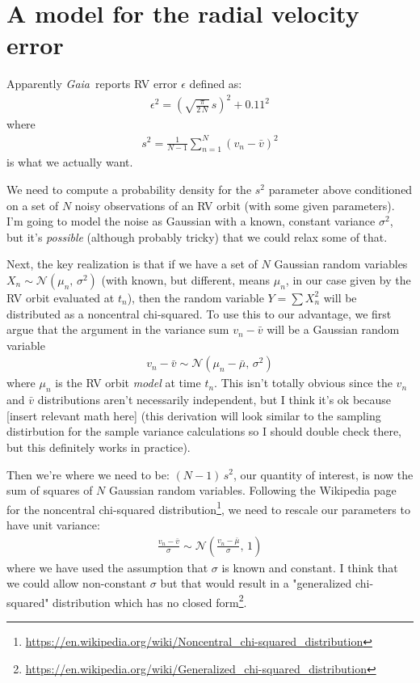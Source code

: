 \documentclass[modern, letterpaper]{aastex63}
\newcommand{\project}[1]{\textsl{#1}}
\newcommand{\Gaia}{\project{Gaia}}
\begin{document}
\section{A model for the radial velocity error}

Apparently \Gaia\ reports RV error $\epsilon$ defined as:
\begin{eqnarray}
	\epsilon^2 = \left(\sqrt{\frac{\pi}{2\,N}}\,s\right)^2 + 0.11^2
\end{eqnarray}
where
\begin{eqnarray}
	s^2 = \frac{1}{N-1}\sum_{n=1}^N \left(v_n - \bar{v}\right)^2
\end{eqnarray}
is what we actually want.

We need to compute a probability density for the $s^2$ parameter above conditioned on a set of $N$ noisy observations of an RV orbit (with some given parameters).
I'm going to model the noise as Gaussian with a known, constant variance $\sigma^2$, but it's \emph{possible} (although probably tricky) that we could relax some of that.

Next, the key realization is that if we have a set of $N$ Gaussian random variables $X_n \sim \mathcal{N}\left(\mu_n,\,\sigma^2\right)$ (with known, but different, means $\mu_n$, in our case given by the RV orbit evaluated at $t_n$), then the random variable $Y = \sum X_n^2$ will be distributed as a noncentral chi-squared.
To use this to our advantage, we first argue that the argument in the variance sum $v_n - \bar{v}$ will be a Gaussian random variable
\begin{eqnarray}
	v_n - \bar{v} \sim \mathcal{N}\left(\mu_n - \bar{\mu},\,\sigma^2\right)
\end{eqnarray}
where $\mu_n$ is the RV orbit \emph{model} at time $t_n$.
This isn't totally obvious since the $v_n$ and $\bar{v}$ distributions aren't necessarily independent, but I think it's ok because [insert relevant math here] (this derivation will look similar to the sampling distirbution for the sample variance calculations so I should double check there, but this definitely works in practice).

Then we're where we need to be: $(N - 1)\,s^2$, our quantity of interest, is now the sum of squares of $N$ Gaussian random variables.
Following the Wikipedia page for the noncentral chi-squared distribution\footnote{\url{https://en.wikipedia.org/wiki/Noncentral_chi-squared_distribution}}, we need to rescale our parameters to have unit variance:
\begin{eqnarray}
	\frac{v_n - \bar{v}}{\sigma} \sim \mathcal{N}\left(\frac{v_n - \bar{\mu}}{\sigma},\,1\right)
\end{eqnarray}
where we have used the assumption that $\sigma$ is known and constant.
I think that we could allow non-constant $\sigma$ but that would result in a "generalized chi-squared" distribution which has no closed form\footnote{\url{https://en.wikipedia.org/wiki/Generalized_chi-squared_distribution}}.
\end{document}
